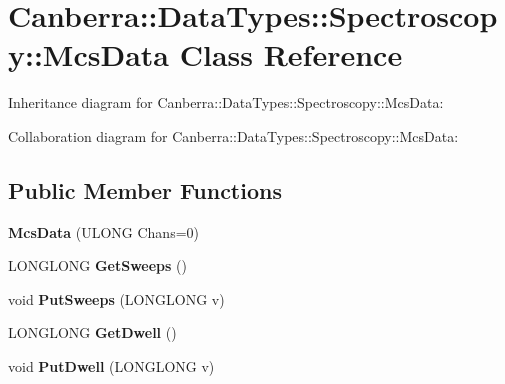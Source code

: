\hypertarget{class_canberra_1_1_data_types_1_1_spectroscopy_1_1_mcs_data}{}\section{Canberra\+:\+:Data\+Types\+:\+:Spectroscopy\+:\+:Mcs\+Data Class Reference}
\label{class_canberra_1_1_data_types_1_1_spectroscopy_1_1_mcs_data}


Inheritance diagram for Canberra\+:\+:Data\+Types\+:\+:Spectroscopy\+:\+:Mcs\+Data\+:


Collaboration diagram for Canberra\+:\+:Data\+Types\+:\+:Spectroscopy\+:\+:Mcs\+Data\+:
\subsection*{Public Member Functions}
\begin{DoxyCompactItemize}
\item 
\mbox{\label{class_canberra_1_1_data_types_1_1_spectroscopy_1_1_mcs_data_a4de6a933495d029dba9abec79fc0c7f7}} 
{\bfseries Mcs\+Data} (U\+L\+O\+NG Chans=0)
\item 
\mbox{\label{class_canberra_1_1_data_types_1_1_spectroscopy_1_1_mcs_data_af3b95a1dc9e579e7e9629c3ca73de380}} 
L\+O\+N\+G\+L\+O\+NG {\bfseries Get\+Sweeps} ()
\item 
\mbox{\label{class_canberra_1_1_data_types_1_1_spectroscopy_1_1_mcs_data_a007010471021bb51751923b1b0df0e9b}} 
void {\bfseries Put\+Sweeps} (L\+O\+N\+G\+L\+O\+NG v)
\item 
\mbox{\label{class_canberra_1_1_data_types_1_1_spectroscopy_1_1_mcs_data_a92fe69c22dd67835726de7c26b1d2a57}} 
L\+O\+N\+G\+L\+O\+NG {\bfseries Get\+Dwell} ()
\item 
\mbox{\label{class_canberra_1_1_data_types_1_1_spectroscopy_1_1_mcs_data_a37d504632b3b59601ba622e678202318}} 
void {\bfseries Put\+Dwell} (L\+O\+N\+G\+L\+O\+NG v)
\end{DoxyCompactItemize}
